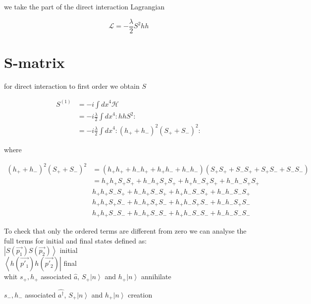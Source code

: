 we take the part of the direct interaction Lagrangian

\begin{equation}
\mathcal{L}=-\frac{\lambda}{2}S^2 hh
\end{equation}

\section{S-matrix}

for direct interaction to first order we obtain $S$

\begin{equation}
\begin{split}
S^{(1)} & {=- i \int {dx}^4 \mathcal{H}}\\
& =  {- i \frac{\lambda}{2}\int {dx}^4 :hhS^2:}\\
&  =  {- i \frac{\lambda}{2}\int {dx}^4 :{(h_++h_-)}^2{(S_++S_-)}^2 :}
\end{split}
\end{equation}

where

\begin{equation}
\begin{split}
{(h_++h_-)}^2{(S_++S_-)}^2 & = (h_+h_++h_-h_++h_+h_-+h_-h_-)(S_+S_++S_-S_++S_+S_-+S_-S_-)\\
& = {h_+h_+S_+S_++h_-h_+S_+S_++h_+h_-S_+S_++h_-h_-S_+S_+}\\
&  {h_+h_+S_-S_++h_-h_+S_-S_++h_+h_-S_-S_++h_-h_-S_-S_+}\\
&  {h_+h_+S_+S_-+h_-h_+S_+S_-+h_+h_-S_+S_-+h_-h_-S_+S_-}\\
&  {h_+h_+S_-S_-+h_-h_+S_-S_-+h_+h_-S_-S_-+h_-h_-S_-S_-}
\end{split}
\end{equation}

To check that only the ordered terms are different from zero we can analyse the full terms for initial and final states defined as:\\
 $\left| S(\vec{p_1})S(\vec{p_2}) \right\rangle $ initial\\
 $\left\langle  h(\vec{p'_1}) h(\vec{p'_2})\right|$ final\\

whit $s_+, h_+$ associated $ \hat {a}$, $S_+ \left |n\right \rangle$ and $h_+ \left|n\right\rangle$ annihilate

$s_-, h_-$ associated $ \hat {a^{\dagger}}$, $S_+ \left |n\right \rangle$ and $h_+ \left|n\right\rangle$ creation\\

